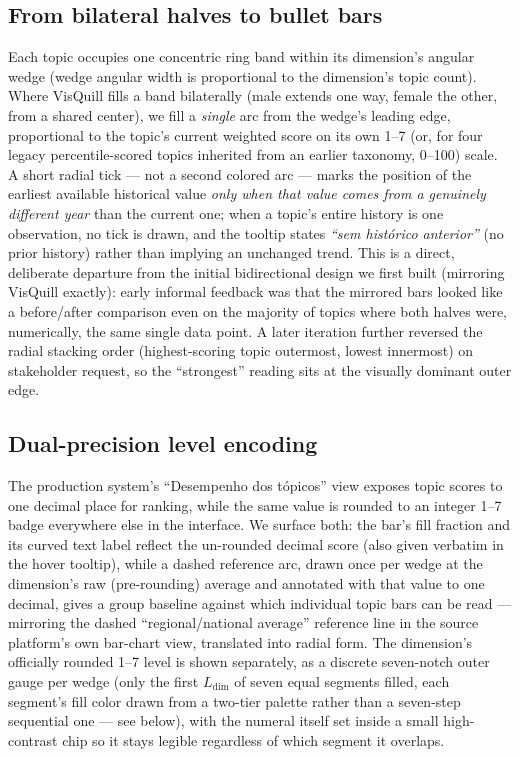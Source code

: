 \documentclass[10pt,twocolumn]{article}
\begin{document}
\subsection{From bilateral halves to bullet bars}
\label{sec:bullet}
Each topic occupies one concentric ring band within its dimension's angular wedge (wedge angular width is proportional to the dimension's topic count). Where VisQuill fills a band bilaterally (male extends one way, female the other, from a shared center), we fill a \emph{single} arc from the wedge's leading edge, proportional to the topic's current weighted score on its own 1--7 (or, for four legacy percentile-scored topics inherited from an earlier taxonomy, 0--100) scale. A short radial tick — not a second colored arc — marks the position of the earliest available historical value \emph{only when that value comes from a genuinely different year} than the current one; when a topic's entire history is one observation, no tick is drawn, and the tooltip states \emph{``sem hist\'orico anterior''} (no prior history) rather than implying an unchanged trend. This is a direct, deliberate departure from the initial bidirectional design we first built (mirroring VisQuill exactly): early informal feedback was that the mirrored bars looked like a before/after comparison even on the majority of topics where both halves were, numerically, the same single data point. A later iteration further reversed the radial stacking order (highest-scoring topic outermost, lowest innermost) on stakeholder request, so the ``strongest'' reading sits at the visually dominant outer edge.

\subsection{Dual-precision level encoding}
The production system's ``Desempenho dos t\'opicos'' view exposes topic scores to one decimal place for ranking, while the same value is rounded to an integer 1--7 badge everywhere else in the interface. We surface both: the bar's fill fraction and its curved text label reflect the un-rounded decimal score (also given verbatim in the hover tooltip), while a dashed reference arc, drawn once per wedge at the dimension's raw (pre-rounding) average and annotated with that value to one decimal, gives a group baseline against which individual topic bars can be read — mirroring the dashed ``regional/national average'' reference line in the source platform's own bar-chart view, translated into radial form. The dimension's officially rounded 1--7 level is shown separately, as a discrete seven-notch outer gauge per wedge (only the first $L_{\text{dim}}$ of seven equal segments filled, each segment's fill color drawn from a two-tier palette rather than a seven-step sequential one — see below), with the numeral itself set inside a small high-contrast chip so it stays legible regardless of which segment it overlaps.
\end{document}
